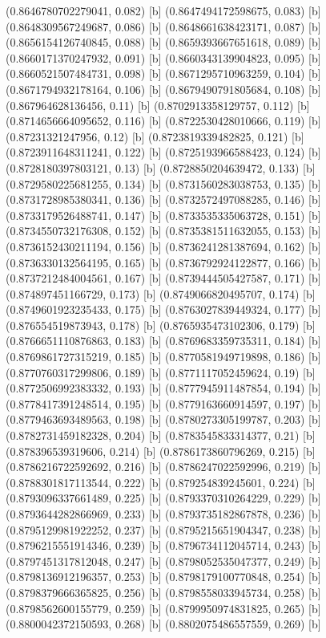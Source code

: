{{{(0.8646780702279041, 0.082) [b] 
(0.8647494172598675, 0.083) [b] 
(0.8648309567249687, 0.086) [b] 
(0.8648661638423171, 0.087) [b] 
(0.8656154126740845, 0.088) [b] 
(0.8659393667651618, 0.089) [b] 
(0.8660171370247932, 0.091) [b] 
(0.8660343139904823, 0.095) [b] 
(0.8660521507484731, 0.098) [b] 
(0.8671295710963259, 0.104) [b] 
(0.8671794932178164, 0.106) [b] 
(0.8679490791805684, 0.108) [b] 
(0.867964628136456, 0.11) [b] 
(0.8702913358129757, 0.112) [b] 
(0.8714656664095652, 0.116) [b] 
(0.8722530428010666, 0.119) [b] 
(0.87231321247956, 0.12) [b] 
(0.8723819339482825, 0.121) [b] 
(0.8723911648311241, 0.122) [b] 
(0.8725193966588423, 0.124) [b] 
(0.8728180397803121, 0.13) [b] 
(0.8728850204639472, 0.133) [b] 
(0.8729580225681255, 0.134) [b] 
(0.8731560283038753, 0.135) [b] 
(0.8731728985380341, 0.136) [b] 
(0.8732572497088285, 0.146) [b] 
(0.8733179526488741, 0.147) [b] 
(0.8733535335063728, 0.151) [b] 
(0.8734550732176308, 0.152) [b] 
(0.8735381511632055, 0.153) [b] 
(0.8736152430211194, 0.156) [b] 
(0.8736241281387694, 0.162) [b] 
(0.8736330132564195, 0.165) [b] 
(0.8736792924122877, 0.166) [b] 
(0.8737212484004561, 0.167) [b] 
(0.8739444505427587, 0.171) [b] 
(0.874897451166729, 0.173) [b] 
(0.8749066820495707, 0.174) [b] 
(0.8749601923235433, 0.175) [b] 
(0.8763027839449324, 0.177) [b] 
(0.876554519873943, 0.178) [b] 
(0.8765935473102306, 0.179) [b] 
(0.8766651110876863, 0.183) [b] 
(0.8769683359735311, 0.184) [b] 
(0.8769861727315219, 0.185) [b] 
(0.8770581949719898, 0.186) [b] 
(0.8770760317299806, 0.189) [b] 
(0.8771117052459624, 0.19) [b] 
(0.8772506992383332, 0.193) [b] 
(0.8777945911487854, 0.194) [b] 
(0.8778417391248514, 0.195) [b] 
(0.8779163660914597, 0.197) [b] 
(0.8779463693489563, 0.198) [b] 
(0.8780273305199787, 0.203) [b] 
(0.8782731459182328, 0.204) [b] 
(0.8783545833314377, 0.21) [b] 
(0.878396539319606, 0.214) [b] 
(0.8786173860796269, 0.215) [b] 
(0.8786216722592692, 0.216) [b] 
(0.8786247022592996, 0.219) [b] 
(0.8788301817113544, 0.222) [b] 
(0.879254839245601, 0.224) [b] 
(0.8793096337661489, 0.225) [b] 
(0.8793370310264229, 0.229) [b] 
(0.8793644282866969, 0.233) [b] 
(0.8793735182867878, 0.236) [b] 
(0.8795129981922252, 0.237) [b] 
(0.8795215651904347, 0.238) [b] 
(0.8796215551914346, 0.239) [b] 
(0.8796734112045714, 0.243) [b] 
(0.8797451317812048, 0.247) [b] 
(0.8798052535047377, 0.249) [b] 
(0.8798136912196357, 0.253) [b] 
(0.8798179100770848, 0.254) [b] 
(0.8798379666365825, 0.256) [b] 
(0.8798558033945734, 0.258) [b] 
(0.8798562600155779, 0.259) [b] 
(0.8799950974831825, 0.265) [b] 
(0.8800042372150593, 0.268) [b] 
(0.8802075486557559, 0.269) [b] 
}}}
